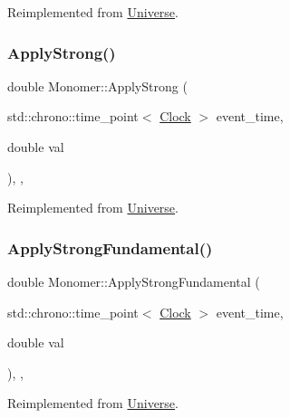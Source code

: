 Reimplemented from \mbox{\hyperlink{classUniverse_a76c0b5e63c2a7d1988c44db341c3d64c}{Universe}}.

\mbox{\label{classMonomer_acba5091693082fdf2d28f1a5a4ae19a1}} 
\subsubsection{\texorpdfstring{Apply\+Strong()}{ApplyStrong()}}
{\footnotesize\ttfamily double Monomer\+::\+Apply\+Strong (\begin{DoxyParamCaption}\item[{std\+::chrono\+::time\+\_\+point$<$ \mbox{\hyperlink{universe_8h_a0ef8d951d1ca5ab3cfaf7ab4c7a6fd80}{Clock}} $>$}]{event\+\_\+time,  }\item[{double}]{val }\end{DoxyParamCaption})\hspace{0.3cm}{\ttfamily [inline]}, {\ttfamily [final]}, {\ttfamily [virtual]}}



Reimplemented from \mbox{\hyperlink{classUniverse_a906a88b37f10bfa630bef49dfd0e907a}{Universe}}.

\mbox{\label{classMonomer_aa186454670f7796e196509238d419a35}} 
\subsubsection{\texorpdfstring{Apply\+Strong\+Fundamental()}{ApplyStrongFundamental()}}
{\footnotesize\ttfamily double Monomer\+::\+Apply\+Strong\+Fundamental (\begin{DoxyParamCaption}\item[{std\+::chrono\+::time\+\_\+point$<$ \mbox{\hyperlink{universe_8h_a0ef8d951d1ca5ab3cfaf7ab4c7a6fd80}{Clock}} $>$}]{event\+\_\+time,  }\item[{double}]{val }\end{DoxyParamCaption})\hspace{0.3cm}{\ttfamily [inline]}, {\ttfamily [final]}, {\ttfamily [virtual]}}



Reimplemented from \mbox{\hyperlink{classUniverse_a62789bcff84bd750b0366004381e2fdd}{Universe}}.

